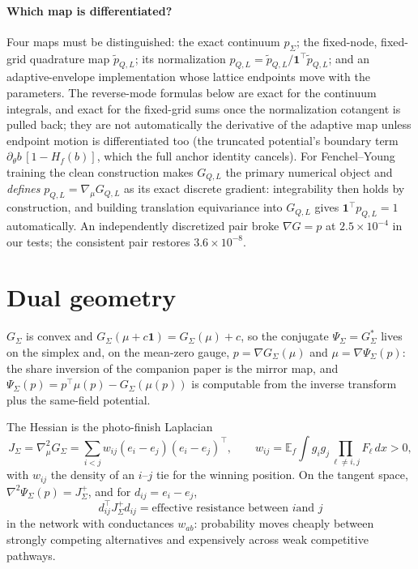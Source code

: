 \documentclass[11pt]{article}
\theoremstyle{remark}
\newcommand{\E}{\mathbb{E}}
\begin{document}
\paragraph{Which map is differentiated?} Four maps must be
distinguished: the exact continuum $p_\Sigma$; the fixed-node,
fixed-grid quadrature map $\tilde p_{Q,L}$; its normalization
$p_{Q,L} = \tilde p_{Q,L} / \mathbf{1}^\top \tilde p_{Q,L}$; and an
adaptive-envelope implementation whose lattice endpoints move with the
parameters. The reverse-mode formulas below are exact for the continuum
integrals, and exact for the fixed-grid sums once the normalization
cotangent is pulled back; they are not automatically the derivative of
the adaptive map unless endpoint motion is differentiated too (the
truncated potential's boundary term $\partial_\theta b\,[1 - H_f(b)]$,
which the full anchor identity cancels). For Fenchel--Young training the
clean construction makes $G_{Q,L}$ the primary numerical object and
\emph{defines} $p_{Q,L} = \nabla_\mu G_{Q,L}$ as its exact discrete
gradient: integrability then holds by construction, and building
translation equivariance into $G_{Q,L}$ gives
$\mathbf{1}^\top p_{Q,L} = 1$ automatically. An independently
discretized pair broke $\nabla G = p$ at $2.5\times10^{-4}$ in our
tests; the consistent pair restores $3.6\times10^{-8}$.

\section{Dual geometry}\label{sec:dual}

$G_\Sigma$ is convex and $G_\Sigma(\mu + c\mathbf{1}) = G_\Sigma(\mu) +
c$, so the conjugate $\Psi_\Sigma = G_\Sigma^*$ lives on the simplex
and, on the mean-zero gauge, $p = \nabla G_\Sigma(\mu)$ and $\mu =
\nabla \Psi_\Sigma(p)$: the share inversion of the companion paper is
the mirror map, and $\Psi_\Sigma(p) = p^\top \mu(p) - G_\Sigma(\mu(p))$
is computable from the inverse transform plus the same-field potential.

The Hessian is the photo-finish Laplacian
\[
J_\Sigma = \nabla_\mu^2 G_\Sigma = \sum_{i<j} w_{ij} (e_i - e_j)(e_i -
e_j)^\top, \qquad
w_{ij} = \E_f \int g_i g_j \prod_{\ell \ne i,j} F_\ell \, dx > 0,
\]
with $w_{ij}$ the density of an $i$--$j$ tie for the winning position.
On the tangent space, $\nabla^2 \Psi_\Sigma(p) = J_\Sigma^+$, and for
$d_{ij} = e_i - e_j$,
\[
d_{ij}^\top J_\Sigma^+ d_{ij} = \text{effective resistance between $i$
and $j$}
\]
in the network with conductances $w_{ab}$: probability moves cheaply
between strongly competing alternatives and expensively across weak
competitive pathways.
\end{document}
